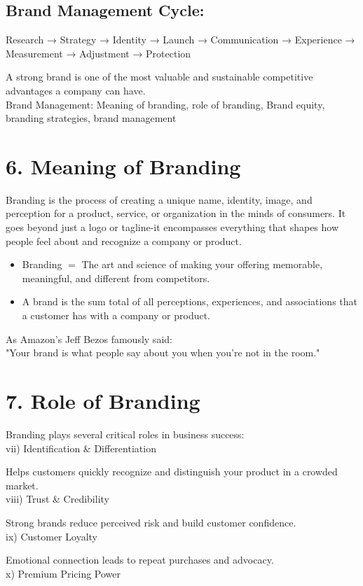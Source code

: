 \documentclass[10pt]{article}
\begin{document}
\subsection*{Brand Management Cycle:}
Research → Strategy → Identity → Launch → Communication → Experience → Measurement → Adjustment → Protection

A strong brand is one of the most valuable and sustainable competitive advantages a company can have.\\
Brand Management: Meaning of branding, role of branding, Brand equity, branding strategies, brand management

\section*{6. Meaning of Branding}
Branding is the process of creating a unique name, identity, image, and perception for a product, service, or organization in the minds of consumers. It goes beyond just a logo or tagline-it encompasses everything that shapes how people feel about and recognize a company or product.

\begin{itemize}
  \item Branding $=$ The art and science of making your offering memorable, meaningful, and different from competitors.
  \item A brand is the sum total of all perceptions, experiences, and associations that a customer has with a company or product.
\end{itemize}

As Amazon's Jeff Bezos famously said:\\
"Your brand is what people say about you when you're not in the room."

\section*{7. Role of Branding}
Branding plays several critical roles in business success:\\
vii) Identification \& Differentiation

Helps customers quickly recognize and distinguish your product in a crowded market.\\
viii) Trust \& Credibility

Strong brands reduce perceived risk and build customer confidence.\\
ix) Customer Loyalty

Emotional connection leads to repeat purchases and advocacy.\\
x) Premium Pricing Power
\end{document}
